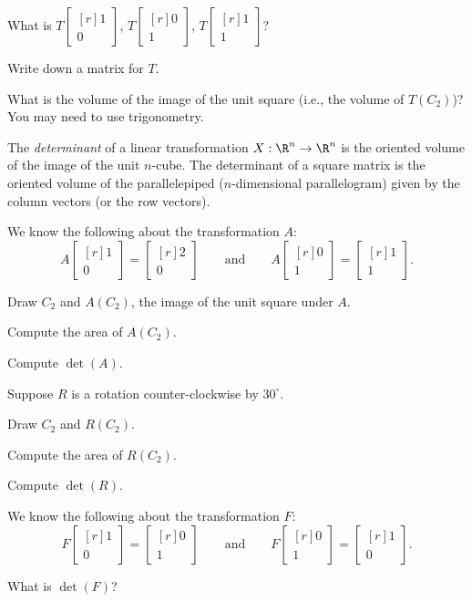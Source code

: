 \documentclass{problemset}
\newcommand{\mat}[1]{\begin{bmatrix*}[r]#1\end{bmatrix*}}
\begin{document}
	\begin{parts}
		\item What is $T\mat{1\\0}$, $T\mat{0\\1}$, $T\mat{1\\1}$?
		\item Write down a matrix for $T$.
		\item What is the volume of the image of the unit square (i.e., the volume of $T(C_2)$)?  You may need
			to use trigonometry.
	\end{parts}
	
	\begin{definition}[Determinant]
	The \emph{determinant} of a linear transformation $X:\R^n\to \R^n$ is the 
	oriented volume of the image of the unit $n$-cube.  The determinant
	of a square matrix is the oriented volume of the parallelepiped 
		($n$-dimensional parallelogram) given by the column vectors (or the row
		vectors).
	\end{definition}

	\question
	We know the following about the transformation $A$:
	\[
		A\mat{1\\0}=\mat{2\\0}\qquad\text{and}\qquad A\mat{0\\1}=\mat{1\\1}.
	\]
	\begin{parts}
	\item Draw $C_2$ and $A(C_2)$, the image of the unit square
			under $A$.
		\item Compute the area of $A (C_2)$.
		\item Compute $\det(A)$.
	\end{parts}

	\question
	Suppose $R$ is a rotation counter-clockwise by $30^\circ$.
	\begin{parts}
	\item Draw $C_2$ and $R(C_2)$.
	\item Compute the area of $R(C_2)$.
		\item Compute $\det(R)$.
	\end{parts}
	
	\question
	We know the following about the transformation $F$:
	\[
		F\mat{1\\0}=\mat{0\\1}\qquad\text{and}\qquad F\mat{0\\1}=\mat{1\\0}.
	\]
	\begin{parts}
		\item What is $\det(F)$?
	\end{parts}
\end{document}
